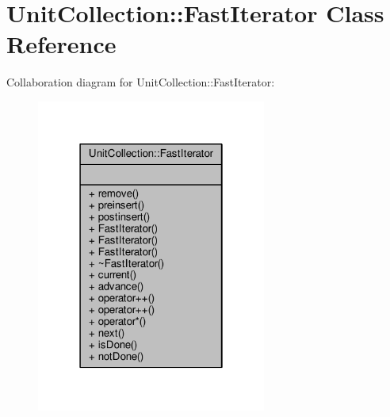 \hypertarget{classUnitCollection_1_1FastIterator}{}\section{Unit\+Collection\+:\+:Fast\+Iterator Class Reference}
\label{classUnitCollection_1_1FastIterator}


Collaboration diagram for Unit\+Collection\+:\+:Fast\+Iterator\+:
\nopagebreak
\begin{figure}[H]
\begin{center}
\leavevmode
\includegraphics[width=214pt]{da/daf/classUnitCollection_1_1FastIterator__coll__graph}
\end{center}
\end{figure}
